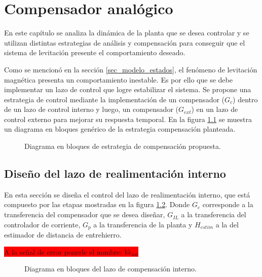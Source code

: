 \chapter{Compensador analógico}  \label{cap:Compensador Analogico}

En este capítulo se analiza la dinámica de la planta que se desea controlar y se utilizan distintas estrategias de análisis y compensación para conseguir que el sistema de levitación presente el comportamiento deseado. 

Como se mencionó en la sección \ref{sec_modelo_estados}, el fenómeno de levitación magnética presenta un comportamiento inestable. Es por ello que se debe implementar un lazo de control que logre estabilizar el sistema. Se propone una estrategia de control mediante la implementación de un compensador ($G_c$) dentro de un lazo de control interno y luego, un compensador ($G_{ext}$) en un lazo de control externo para mejorar su respuesta temporal. En la figura \ref{fig:diag-en-bloques-comp} se muestra un diagrama en bloques genérico de la estrategia compensación planteada.

\begin{figure}[H]
	\centering
	\scalebox{0.8}{}
	\caption{Diagrama en bloques de estrategia de compensación propuesta.}	\label{fig:diag-en-bloques-comp}
\end{figure}

\section{Diseño del lazo de realimentación interno}

En esta sección se diseña el control del lazo de realimentación interno, que está compuesto por las etapas mostradas en la figura \ref{fig:diag-interno}. Donde $G_c$ corresponde a la transferencia del compensador que se desea diseñar, $G_{IL}$ a la transferencia del controlador de corriente, $G_p$ a la transferencia de la planta y $H_{estim}$ a la del estimador de distancia de entrehierro.

\colorbox{red}{A la señal de error ponerle el nombre: $Ve_{int}$}

\begin{figure}[H]
	\centering
	
	\caption{Diagrama en bloques del lazo de compensación interno.}	\label{fig:diag-interno}
\end{figure}

